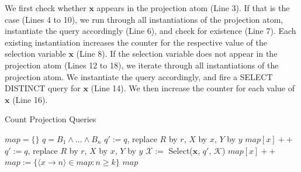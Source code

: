 We first check whether $\bm{x}$ appears in the projection atom (Line 3).
If that is the case (Lines 4 to 10), we run through all instantiations of the projection atom, instantiate the query accordingly (Line 6), and check for existence (Line 7).
Each existing instantiation increases the counter for the respective value of the selection variable $\bm{x}$ (Line 8).
If the selection variable does not appear in the projection atom (Lines 12 to 18),
we iterate through all instantiations of the projection atom.
We instantiate the query accordingly, and fire a SELECT DISTINCT query for $\bm{x}$ (Line 14).
We then increase the counter for each value of $\bm{x}$ (Line 16).

\begin{algorithm}
\caption{Count Projection Queries}
\label{algi}
\begin{algorithmic}[1]
    \State $map = \{\}$
    \State $q=B_1 \wedge ... \wedge B_n$
	    \State $q' :=q$, replace $R$ by $r$, $X$ by $x$, $Y$ by $y$
		\State $map[x]++$
	    \EndIf
	  \EndFor
	\Else
	    \State $q' := q$, replace $R$ by $r$, $X$ by $x$, $Y$ by $y$
	    \State $\mathcal{X} :=$ Select($\bm{x}$, $q'$, $\mathcal{K}$)
		  \State $map[x]++$
	    \EndFor
	  \EndFor
	\EndIf
	\State $map := \{ \langle x \rightarrow n\rangle \in map : n \geq k\}$
	\State \Return $map$
\EndFunction
\end{algorithmic}
\end{algorithm}


